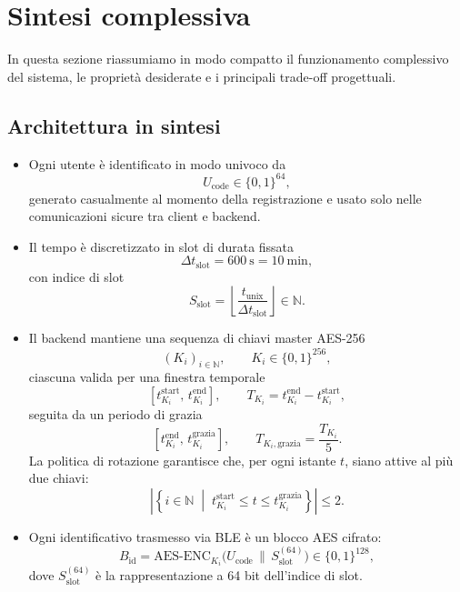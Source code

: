 \documentclass[a4paper,11pt]{article}
\begin{document}
\section{Sintesi complessiva}

In questa sezione riassumiamo in modo compatto il funzionamento complessivo del sistema, le
proprietà desiderate e i principali trade-off progettuali.

\subsection{Architettura in sintesi}

\begin{itemize}
  \item Ogni utente è identificato in modo univoco da
        \[
          U_{\text{code}} \in \{0,1\}^{64},
        \]
        generato casualmente al momento della registrazione e usato solo nelle comunicazioni
        sicure tra client e backend.

  \item Il tempo è discretizzato in slot di durata fissata
        \[
          \Delta t_{\text{slot}} = \SI{600}{\second} = \SI{10}{\minute},
        \]
        con indice di slot
        \[
          S_{\text{slot}} = \left\lfloor \frac{t_{\text{unix}}}{\Delta t_{\text{slot}}} \right\rfloor
          \in \mathbb{N}.
        \]

  \item Il backend mantiene una sequenza di chiavi master AES-256
        \[
          (K_i)_{i\in\mathbb{N}}, \qquad K_i \in \{0,1\}^{256},
        \]
        ciascuna valida per una finestra temporale
        \[
          [t_{K_i}^{\text{start}},\, t_{K_i}^{\text{end}}],
          \qquad T_{K_i} = t_{K_i}^{\text{end}} - t_{K_i}^{\text{start}},
        \]
        seguita da un periodo di grazia
        \[
          [t_{K_i}^{\text{end}},\, t_{K_i}^{\text{grazia}}],
          \qquad T_{K_i,\mathrm{grazia}} = \frac{T_{K_i}}{5}.
        \]
        La politica di rotazione garantisce che, per ogni istante \(t\), siano attive al più due
        chiavi:
        \[
          \left|
          \left\{
          i \in \mathbb{N}
          \;\middle|\;
          t_{K_i}^{\text{start}} \le t \le t_{K_i}^{\text{grazia}}
          \right\}
          \right| \le 2.
        \]

  \item Ogni identificativo trasmesso via BLE è un blocco AES cifrato:
        \[
          B_{\text{id}} =
          \mathrm{AES\text{-}ENC}_{K_i}\bigl(U_{\text{code}} \,\|\, S_{\text{slot}}^{(64)}\bigr)
          \in \{0,1\}^{128},
        \]
        dove \(S_{\text{slot}}^{(64)}\) è la rappresentazione a 64 bit dell’indice di slot.


\end{itemize}
\end{document}
